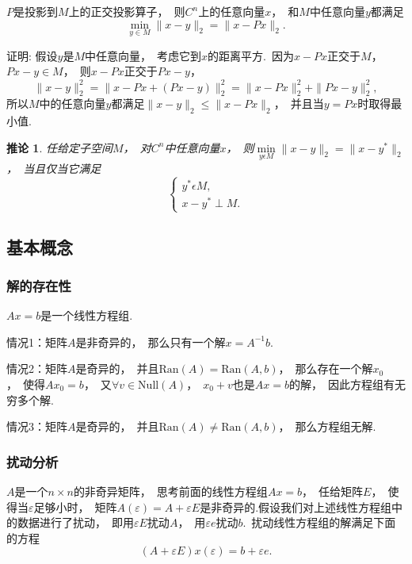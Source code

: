 \documentclass{article}
\newcommand{\Null}{\text{Null}}
\newcommand{\Ran}{\text{Ran}}
\begin{document}
\begin{thm}
$P$是投影到$M$上的正交投影算子，~则$C^n$上的任意向量$x$，~和$M$中任意向量$y$都满足
$$\min \limits_{y\in M}\parallel x-y\parallel _2=\parallel x-Px\parallel _2.$$
\end{thm}
证明:
假设$y$是$M$中任意向量，~考虑它到$x$的距离平方.~因为$x-Px$正交于$M$，~$Px-y\in M$，~则$x-Px$正交于$Px-y$，
$$\parallel x-y\parallel _2^2=\parallel x-Px+(Px-y)\parallel _2^2=\parallel x-Px\parallel _2^2+\parallel Px-y\parallel _2^2,$$
所以$M$中的任意向量$y$都满足$\parallel x-y\parallel _2\le \parallel x-Px\parallel _2$，~并且当$y=Px$时取得最小值.

\newtheorem{corollary}{推论}
\begin{corollary}
任给定子空间$M$，~对$C^n$中任意向量$x$，~则$\min \limits_{y\epsilon M} \parallel x-y\parallel _2= \parallel x-y^*\parallel _2$，~当且仅当它满足
$$\begin{cases}
y^*  \epsilon M, \\
x-y^*\perp M.
\end{cases}
$$
\end{corollary}

\subsection{基本概念}
\subsubsection{解的存在性}
$Ax=b$是一个线性方程组.

情况1：矩阵$A$是非奇异的，~那么只有一个解$x=A^{-1}b$.

情况2：矩阵$A$是奇异的，~并且$\Ran(A)=\Ran(A,b)$，~那么存在一个解$x_0$，~使得$Ax_0=b$，~又$\forall v \in \Null(A)$，~$x_0+v$也是$Ax=b$的解，~因此方程组有无穷多个解.

情况3：矩阵$A$是奇异的，~并且$\Ran(A)\neq \Ran(A,b)$，~那么方程组无解.

\subsubsection{扰动分析}
$A$是一个$n\times n$的非奇异矩阵，~思考前面的线性方程组$Ax=b$，~任给矩阵$E$，~使得当$\varepsilon$足够小时，~矩阵$A(\varepsilon)=A+\varepsilon E$是非奇异的.假设我们对上述线性方程组中的数据进行了扰动，~即用$\varepsilon E$扰动$A$，~用$\varepsilon e$扰动$b$.\ 扰动线性方程组的解满足下面的方程
$$(A+\varepsilon E)x(\varepsilon)=b+\varepsilon e.$$
\end{document}
